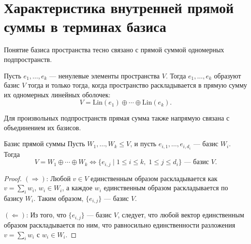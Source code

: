 
\section{Характеристика внутренней прямой суммы в терминах базиса}

Понятие базиса пространства тесно связано с прямой суммой одномерных подпространств.
\begin{Remark}{}{}
	Пусть $e_1, \ldots, e_k$ — ненулевые элементы пространства $V$. Тогда $e_1, \ldots, e_k$ образуют базис $V$ тогда и только тогда, когда пространство раскладывается в прямую сумму их одномерных линейных оболочек:
	\[
	V = \mathrm{Lin}(e_1) \oplus \cdots \oplus \mathrm{Lin}(e_k).
	\]
\end{Remark}

Для произвольных подпространств прямая сумма также напрямую связана с объединением их базисов.

\begin{Theorem}{Базис прямой суммы}{}
	Пусть $W_1, \ldots, W_k \leq V$, и пусть $e_{i,1}, \ldots, e_{i,d_i}$ — базис $W_i$. Тогда
	\[
	V = W_1 \oplus \cdots \oplus W_k \iff \{e_{i,j} \mid 1 \leq i \leq k,\; 1 \leq j \leq d_i\} \text{ — базис } V.
	\]
\end{Theorem}

\begin{proof}
	$(\Rightarrow)$: Любой $v \in V$ единственным образом раскладывается как $v = \sum_i w_i$, $w_i \in W_i$, а каждое $w_i$ единственным образом раскладывается по базису $W_i$. Таким образом, $\{e_{i,j}\}$ — базис $V$.
	
	$(\Leftarrow)$: Из того, что $\{e_{i,j}\}$ — базис $V$, следует, что любой вектор единственным образом раскладывается по ним, что равносильно единственности разложения $v = \sum_i w_i$ с $w_i \in W_i$.
\end{proof}